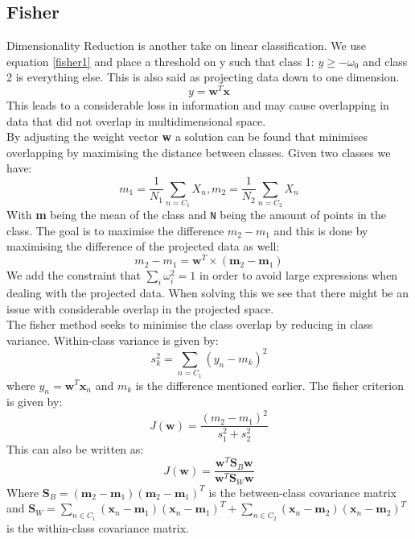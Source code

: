 \subsection{Fisher}
Dimensionality Reduction is another take on linear classification. We use equation \ref{fisher1} and place a threshold on y such that class 1: $y\geqslant -\omega_0$ and class 2 is everything else. This is also said as projecting data down to one dimension.
\begin{equation}
\label{fisher1}
y = \textbf{w}^T\textbf{x}
\end{equation}
This leads to a considerable loss in information and may cause overlapping in data that did not overlap in multidimensional space.\\
By adjusting the weight vector \textbf{w} a solution can be found that minimises overlapping by maximising the distance between classes. Given two classes we have:
\begin{equation}
m_1 = \frac{1}{N_1} \sum_{n=C_1} X_n,       m_2 = \frac{1}{N_2} \sum_{n=C_2} X_n
\end{equation}
With \textbf{m} being the mean of the class and \texttt{N} being the amount of points in the class. The goal is to maximise the difference $m_2 - m_1$ and this is done by maximising the difference of the projected data as well:
\begin{equation}
m_2 - m_1 = \textbf{w}^{T} \times ( \textbf{m}_2 - \textbf{m}_1 )
\end{equation}
We add the constraint that $\sum_i \omega^2_i  = 1$ in order to avoid large expressions when dealing with the projected data. When solving this we see that there might be an issue with considerable overlap in the projected space.\\
The fisher method seeks to minimise the class overlap by reducing in class variance. Within-class variance is given by:
\begin{equation}
s^2_k = \sum_{n=C_1} (y_n - m_k)^2
\end{equation}
where $y_n = \textbf{w}^T\textbf{x}_n$ and $m_k$ is the difference mentioned earlier. The fisher criterion is given by:
\begin{equation}
J(\textbf{w})=\frac{(m_2 - m_1)^2}{s^2_1+s^2_2}
\end{equation}
This can also be written as:
\begin{equation}
J(\textbf{w})=\frac{\textbf{w}^T\textbf{S}_B\textbf{w}}{\textbf{w}^T\textbf{S}_W\textbf{w}}
\end{equation}
Where $\textbf{S}_B = (\textbf{m}_2 - \textbf{m}_1)(\textbf{m}_2 - \textbf{m}_1)^T$ is the between-class covariance matrix and $\textbf{S}_W = \sum_{n\in C_1}(\textbf{x}_n - \textbf{m}_1)(\textbf{x}_n - \textbf{m}_1)^T + \sum_{n\in C_2}(\textbf{x}_n - \textbf{m}_2)(\textbf{x}_n - \textbf{m}_2)^T $ is the within-class covariance matrix.\\
